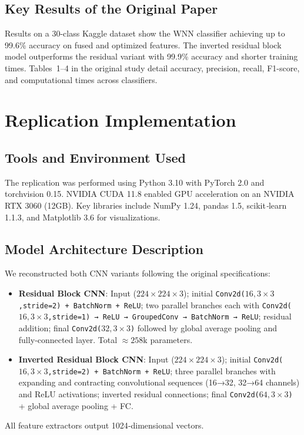 \documentclass[journal,onecolumn]{IEEEtran}
\begin{document}
\subsection{Key Results of the Original Paper}
Results on a 30-class Kaggle dataset show the WNN classifier achieving up to 99.6\% accuracy on fused and optimized features. The inverted residual block model outperforms the residual variant with 99.9\% accuracy and shorter training times. Tables~1--4 in the original study detail accuracy, precision, recall, F1-score, and computational times across classifiers.


\section{Replication Implementation}
\subsection{Tools and Environment Used}
The replication was performed using Python 3.10 with PyTorch 2.0 and torchvision 0.15. NVIDIA CUDA 11.8 enabled GPU acceleration on an NVIDIA RTX 3060 (12GB). Key libraries include NumPy 1.24, pandas 1.5, scikit\textit{‑}learn 1.1.3, and Matplotlib 3.6 for visualizations.

\subsection{Model Architecture Description}
We reconstructed both CNN variants following the original specifications:
\begin{itemize}
  \item \textbf{Residual Block CNN}: Input ($224\times224\times3$); initial \texttt{Conv2d($16,3\times3$,stride=2) + BatchNorm + ReLU}; two parallel branches each with \texttt{Conv2d($16,3\times3$,stride=1) → ReLU → GroupedConv → BatchNorm → ReLU}; residual addition; final \texttt{Conv2d($32,3\times3$)} followed by global average pooling and fully‑connected layer. Total \(\approx258\text{k}\) parameters.
  \item \textbf{Inverted Residual Block CNN}: Input ($224\times224\times3$); initial \texttt{Conv2d($16,3\times3$,stride=2) + BatchNorm + ReLU}; three parallel branches with expanding and contracting convolutional sequences (16→32, 32→64 channels) and ReLU activations; inverted residual connections; final \texttt{Conv2d($64,3\times3$)} + global average pooling + FC.
\end{itemize}
All feature extractors output 1024‑dimensional vectors.
\end{document}
